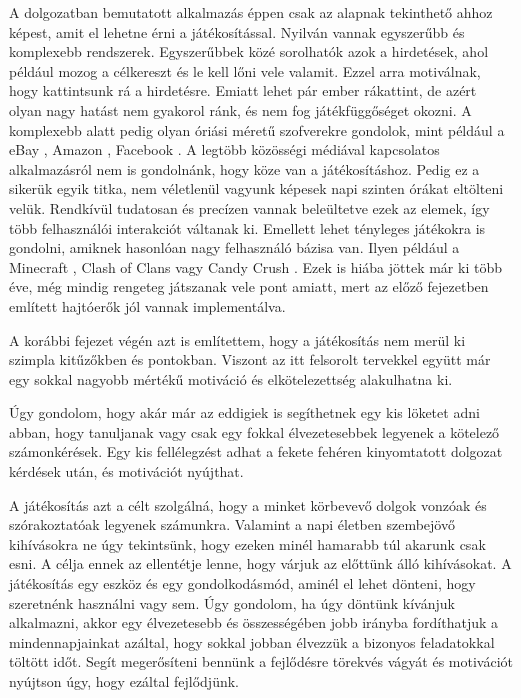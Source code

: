 
A dolgozatban bemutatott alkalmazás éppen csak az alapnak tekinthető ahhoz képest, amit el lehetne érni a játékosítással. Nyilván vannak egyszerűbb és komplexebb rendszerek. Egyszerűbbek közé sorolhatók azok a hirdetések, ahol például mozog a célkereszt és le kell lőni vele valamit. Ezzel arra motiválnak, hogy kattintsunk rá a hirdetésre. Emiatt lehet pár ember rákattint, de azért olyan nagy hatást nem gyakorol ránk, és nem fog játékfüggőséget okozni. A komplexebb alatt pedig olyan óriási méretű szofverekre gondolok, mint például a eBay \cite{ebay}, Amazon \cite{amazon}, Facebook \cite{facebook}. A legtöbb közösségi médiával kapcsolatos alkalmazásról nem is gondolnánk, hogy köze van a játékosításhoz. Pedig ez a sikerük egyik titka, nem véletlenül vagyunk képesek napi szinten órákat eltölteni velük. Rendkívül tudatosan és precízen vannak beleültetve ezek az elemek, így több felhasználói interakciót váltanak ki. Emellett lehet tényleges játékokra is gondolni, amiknek hasonlóan nagy felhasználó bázisa van. Ilyen például a Minecraft \cite{minecraft}, Clash of Clans \cite{clashOfClans} vagy Candy Crush \cite{candycrush}. Ezek is hiába jöttek már ki több éve, még mindig rengeteg játszanak vele pont amiatt, mert az előző fejezetben említett hajtóerők jól vannak implementálva. \newline

A korábbi fejezet végén azt is említettem, hogy a játékosítás nem merül ki szimpla kitűzőkben és pontokban. Viszont az itt felsorolt tervekkel együtt már egy sokkal nagyobb mértékű motiváció és elkötelezettség alakulhatna ki. \newline

Úgy gondolom, hogy akár már az eddigiek is segíthetnek egy kis löketet adni abban, hogy tanuljanak vagy csak egy fokkal élvezetesebbek legyenek a kötelező számonkérések. Egy kis fellélegzést adhat a fekete fehéren kinyomtatott dolgozat kérdések után, és motivációt nyújthat. \newline

A játékosítás azt a célt szolgálná, hogy a minket körbevevő dolgok vonzóak és szórakoztatóak legyenek számunkra. Valamint a napi életben szembejövő kihívásokra ne úgy tekintsünk, hogy ezeken minél hamarabb túl akarunk csak esni. A célja ennek az ellentétje lenne, hogy várjuk az előttünk álló kihívásokat. A játékosítás egy eszköz és egy gondolkodásmód, aminél el lehet dönteni, hogy szeretnénk használni vagy sem. Úgy gondolom, ha úgy döntünk kívánjuk alkalmazni, akkor egy élvezetesebb és összességében jobb irányba fordíthatjuk a mindennapjainkat azáltal, hogy sokkal jobban élvezzük a bizonyos feladatokkal töltött időt. Segít megerősíteni bennünk a fejlődésre törekvés vágyát és motivációt nyújtson úgy, hogy ezáltal fejlődjünk.
